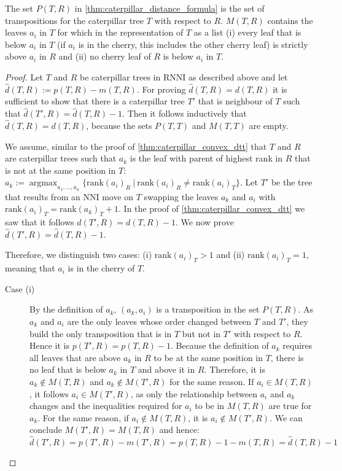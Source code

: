 \documentclass[11pt]{amsart}
\newcommand{\rnni}{\mathrm{RNNI}}
\newcommand{\rank}{\mathrm{rank}}
\newcommand{\nni}{\mathrm{NNI}}
\DeclareMathOperator*{\argmax}{argmax}
\begin{document}
The set $P(T,R)$ in \autoref{thm:caterpillar_distance_formula} is the set of transpositions for the caterpillar tree $T$ with respect to $R$.
$M(T,R)$ contains the leaves $a_i$ in $T$ for which in the representation of $T$ as a list (i) every leaf that is below $a_i$ in $T$ (if $a_i$ is in the cherry, this includes the other cherry leaf) is strictly above $a_i$ in $R$ and (ii) no cherry leaf of $R$ is below $a_i$ in $T$.

\begin{proof}
	Let $T$ and $R$ be caterpillar trees in $\rnni$ as described above and let $\widehat d(T,R) := p(T,R) - m(T,R)$.
	For proving $\widehat d(T,R) = d(T,R)$ it is sufficient to show that there is a caterpillar tree $T'$ that is neighbour of $T$ such that $\widehat d(T',R) = \widehat d(T,R) - 1$.
	Then it follows inductively that $\widehat d(T,R) = d(T,R)$, because the sets $P(T,T)$ and $M(T,T)$ are empty.

	We assume, similar to the proof of \autoref{thm:caterpillar_convex_dtt} that $T$ and $R$ are caterpillar trees such that $a_k$ is the leaf with parent of highest rank in $R$ that is not at the same position in $T$:
	$a_k := \argmax_{a_1, \ldots, a_n}\{\rank(a_i)_{R} \ |\  \rank(a_i)_{R} \neq \rank(a_i)_{T}\}$.
	Let $T'$ be the tree that results from an $\nni$ move on $T$ swapping the leaves $a_k$ and $a_i$ with $\rank(a_i)_T = \rank(a_k)_T + 1$.
	In the proof of \autoref{thm:caterpillar_convex_dtt} we saw that it follows $d(T',R) = d(T,R) - 1$.	
	We now prove $\widehat d(T',R) = \widehat d(T,R) - 1$.

	Therefore, we distinguish two cases: (i) $\rank(a_i)_T>1$ and (ii) $\rank(a_i)_T = 1$, meaning that $a_i$ is in the cherry of $T$.

	\begin{description}
		\item[Case (i)]
			By the definition of $a_k$, $(a_k,a_i)$ is a transposition in the set $P(T,R)$.
			As $a_k$ and $a_i$ are the only leaves whose order changed between $T$ and $T'$, they build the only transposition that is in $T$ but not in $T'$ with respect to $R$.
			Hence it is $p(T',R) = p(T,R) - 1$.
			Because the definition of $a_k$ requires all leaves that are above $a_k$ in $R$ to be at the same position in $T$, there is no leaf that is below $a_k$ in $T$ and above it in $R$.
			Therefore, it is $a_k \notin M(T,R)$ and $a_k \notin M(T',R)$ for the same reason.
			If $a_i \in M(T,R)$, it follows $a_i \in M(T',R)$, as only the relationship between $a_i$ and $a_k$ changes and the inequalities required for $a_i$ to be in $M(T,R)$ are true for $a_k$.
			For the same reason, if $a_i \notin M(T,R)$, it is $a_i \notin M(T',R)$.
			We can conclude $M(T',R) = M(T,R)$ and hence:
			\[\widehat d(T',R) = p(T',R) - m(T',R) = p(T,R) - 1 - m(T,R) = \widehat d(T,R) - 1\]


\end{description}
\end{proof}
\end{document}
